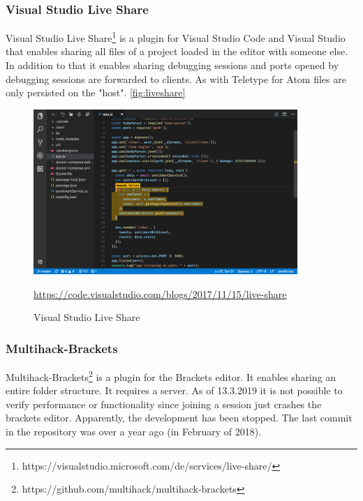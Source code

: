 \subsubsection{Visual Studio Live Share}
Visual Studio Live Share\footnote{https://visualstudio.microsoft.com/de/services/live-share/}  is a plugin for Visual Studio Code and Visual Studio that enables sharing all files of a project loaded in the editor with someone else. In addition to that it enables sharing debugging sessions and ports opened by debugging sessions are forwarded to clients. As with Teletype for Atom files are only persisted on the "host". \autoref{fig:liveshare}
\begin{figure}[hb]
    \centering
    \includegraphics[width=100mm]{figures/screenshots/vscodeliveshare.png}
	\caption{Visual Studio Live Share}
	\href{https://code.visualstudio.com/blogs/2017/11/15/live-share}{https://code.visualstudio.com/blogs/2017/11/15/live-share}
    \label{fig:liveshare}
\end{figure}
\subsubsection{Multihack-Brackets}
Multihack-Brackets\footnote{https://github.com/multihack/multihack-brackets} is a plugin for the Brackets editor. It enables sharing an entire folder structure. It requires a server. As of 13.3.2019 it is not possible to verify performance or functionality since joining a session just crashes the brackets editor. Apparently, the development has been stopped. The last commit in the repository was over a year ago (in February of 2018).
